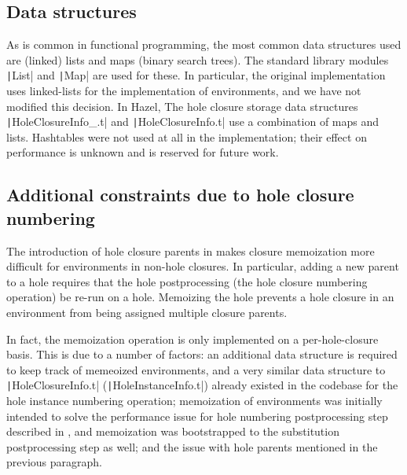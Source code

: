 \subsection{Data structures}
\label{sec:data-structures}

As is common in functional programming, the most common data structures used are (linked) lists and maps (binary search trees). The standard library modules \texttt|List| and \texttt|Map| are used for these. In particular, the original implementation uses linked-lists for the implementation of environments, and we have not modified this decision. In Hazel, The hole closure storage data structures \texttt|HoleClosureInfo_.t| and \texttt|HoleClosureInfo.t| use a combination of maps and lists. Hashtables were not used at all in the implementation; their effect on performance is unknown and is reserved for future work.

\subsection{Additional constraints due to hole closure numbering}
\label{sec:difficulties-hole-numbering}

The introduction of hole closure parents in  makes closure memoization more difficult for environments in non-hole closures. In particular, adding a new parent to a hole requires that the hole postprocessing (the hole closure numbering operation) be re-run on a hole. Memoizing the hole prevents a hole closure in an environment from being assigned multiple closure parents.

In fact, the memoization operation is only implemented on a per-hole-closure basis. This is due to a number of factors: an additional data structure is required to keep track of memeoized environments, and a very similar data structure to \texttt|HoleClosureInfo.t| (\texttt|HoleInstanceInfo.t|) already existed in the codebase for the hole instance numbering operation; memoization of environments was initially intended to solve the performance issue for hole numbering postprocessing step described in , and memoization was bootstrapped to the substitution postprocessing step as well; and the issue with hole parents mentioned in the previous paragraph.

